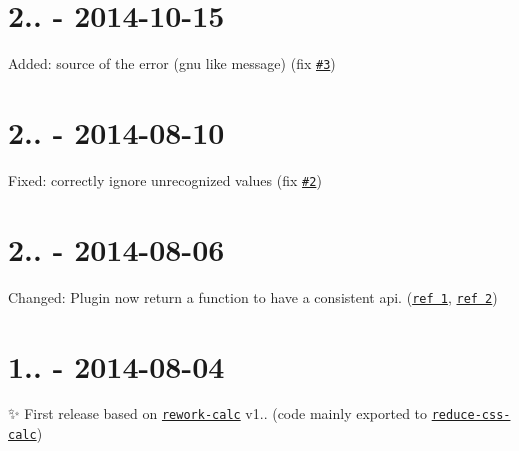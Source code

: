 \section*{2.. -\/ 2014-\/10-\/15}


\begin{DoxyItemize}
\item Added\+: source of the error (gnu like message) (fix \href{https://github.com/postcss/postcss-calc/issues/3}{\tt \#3})
\end{DoxyItemize}

\section*{2.. -\/ 2014-\/08-\/10}


\begin{DoxyItemize}
\item Fixed\+: correctly ignore unrecognized values (fix \href{https://github.com/postcss/postcss-calc/issues/2}{\tt \#2})
\end{DoxyItemize}

\section*{2.. -\/ 2014-\/08-\/06}


\begin{DoxyItemize}
\item Changed\+: Plugin now return a function to have a consistent api. (\href{https://github.com/ianstormtaylor/rework-color-function/issues/6}{\tt ref 1}, \href{https://twitter.com/jongleberry/status/496552790416576513}{\tt ref 2})
\end{DoxyItemize}

\section*{1.. -\/ 2014-\/08-\/04}

✨ First release based on \href{https://github.com/reworkcss/rework-calc}{\tt rework-\/calc} v1.. (code mainly exported to \href{https://github.com/MoOx/reduce-css-calc}{\tt {\ttfamily reduce-\/css-\/calc}}) 